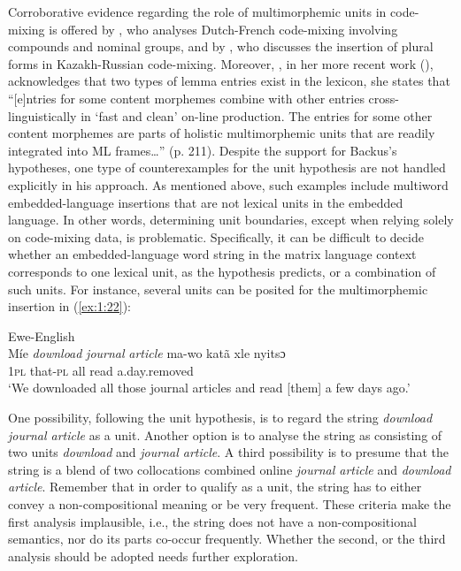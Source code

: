 Corroborative evidence regarding the role of multimorphemic units in code-mixing is offered by \citet{treffers-daller-2005}, who analyses Dutch-French code-mixing involving compounds and nominal groups, and by \citet[67]{muhamedowa-untersuchung-2006}, who discusses the insertion of plural forms in Kazakh-Russian code-mixing. Moreover, \citeauthor{myers-scotton-2006}, in her more recent work (\citeyear{myers-scotton-2006}), acknowledges that two types of lemma entries exist in the lexicon, she states that ``[e]ntries for some content morphemes combine with other entries cross-linguistically in `fast and clean' on-line production. The entries for some other content morphemes are parts of holistic multimorphemic units that are readily integrated into ML frames\dots'' (p. 211). Despite the support for Backus's hypotheses, one type of counterexamples for the unit hypothesis are not handled explicitly in his approach. As mentioned above, such examples include multiword embedded-language insertions that are not lexical units in the embedded language. In other words, determining unit boundaries, except when relying solely on code-mixing data, is problematic. Specifically, it can be difficult to decide whether an embedded-language word string in the matrix language context corresponds to one lexical unit, as the hypothesis predicts, or a combination of such units. For instance, several units can be posited for the multimorphemic insertion in (\ref{ex:1:22}): 

\ea{}\label{ex:1:22}
Ewe-English \citep[22]{amuzu-2013}\\
\gll Míe \textit{download} \textit{journal} \textit{article} ma-wo katã xle nyitsɔ\\
1\textsc{pl} {} {} {} that-\textsc{pl} all read a.day.removed\\
\glt `We downloaded all those journal articles and read [them] a few days ago.'
\z

\noindent One possibility, following the unit hypothesis, is to regard the string \textit{download journal article} as a unit. Another option is to analyse the string as consisting of two units \textit{download} and \textit{journal article}. A third possibility is to presume that the string is a blend of two collocations combined online \textit{journal article} and \textit{download article}. Remember that in order to qualify as a unit, the string has to either convey a non-compositional meaning or be very frequent. These criteria make the first analysis implausible, i.e., the string does not have a non-compositional semantics, nor do its parts co-occur frequently. Whether the second, or the third analysis should be adopted needs further exploration.

